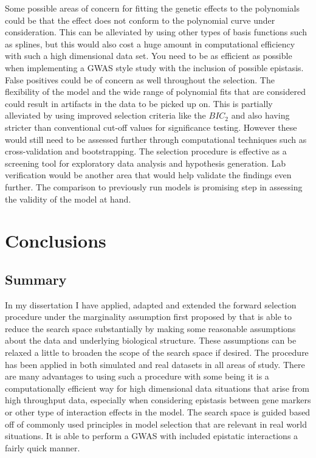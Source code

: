 \documentclass[11pt,]{book}
\theoremstyle{definition}
\theoremstyle{definition}
\theoremstyle{remark}
\begin{document}
Some possible areas of concern for fitting the genetic effects to the
polynomials could be that the effect does not conform to the polynomial
curve under consideration. This can be alleviated by using other types
of basis functions such as splines, but this would also cost a huge
amount in computational efficiency with such a high dimensional data
set. You need to be as efficient as possible when implementing a GWAS
style study with the inclusion of possible epistasis. False positives
could be of concern as well throughout the selection. The flexibility of
the model and the wide range of polynomial fits that are considered
could result in artifacts in the data to be picked up on. This is
partially alleviated by using improved selection criteria like the
\(BIC_2\) and also having stricter than conventional cut-off values for
significance testing. However these would still need to be assessed
further through computational techniques such as cross-validation and
bootstrapping. The selection procedure is effective as a screening tool
for exploratory data analysis and hypothesis generation. Lab
verification would be another area that would help validate the findings
even further. The comparison to previously run models is promising step
in assessing the validity of the model at hand.

\chapter{Conclusions}\label{conclusions-1}

\section{Summary}\label{summary}

In my dissertation I have applied, adapted and extended the forward
selection procedure under the marginality assumption first proposed by
\cite{hao2014interaction} that is able to reduce the search space
substantially by making some reasonable assumptions about the data and
underlying biological structure. These assumptions can be relaxed a
little to broaden the scope of the search space if desired. The
procedure has been applied in both simulated and real datasets in all
areas of study. There are many advantages to using such a procedure with
some being it is a computationally efficient way for high dimensional
data situations that arise from high throughput data, especially when
considering epistasis between gene markers or other type of interaction
effects in the model. The search space is guided based off of commonly
used principles in model selection that are relevant in real world
situations. It is able to perform a GWAS with included epistatic
interactions a fairly quick manner.
\end{document}
